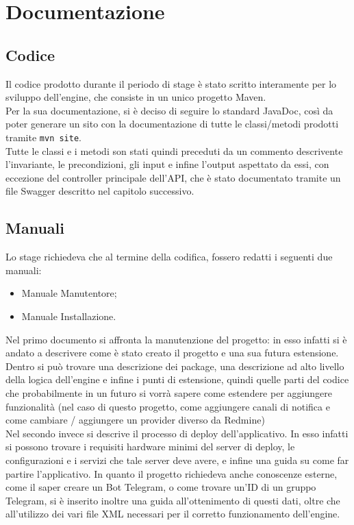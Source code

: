 
\chapter{Documentazione}
\label{cap:documentazione}
	\section{Codice}
		Il codice prodotto durante il periodo di stage è stato scritto interamente per lo sviluppo dell'engine, che consiste in un unico progetto Maven. \\
		Per la sua documentazione, si è deciso di seguire lo standard JavaDoc, così da poter generare un sito con la documentazione di tutte le classi/metodi prodotti tramite \texttt{mvn site}. \\
		Tutte le classi e i metodi son stati quindi preceduti da un commento descrivente l'invariante, le precondizioni, gli input e infine l'output aspettato da essi, con eccezione del controller principale dell'API, che è stato documentato tramite un file Swagger descritto nel capitolo successivo. 
	\section{Manuali}
		Lo stage richiedeva che al termine della codifica, fossero redatti i seguenti due manuali:
		\begin{itemize}
			\item Manuale Manutentore;
			\item Manuale Installazione.
		\end{itemize}
		Nel primo documento si affronta la manutenzione del progetto: in esso infatti si è andato a descrivere come è stato creato il progetto e una sua futura estensione. Dentro si può trovare una descrizione dei package, una descrizione ad alto livello della logica dell'engine e infine i punti di estensione, quindi quelle parti del codice che probabilmente in un futuro si vorrà sapere come estendere per aggiungere funzionalità (nel caso di questo progetto, come aggiungere canali di notifica e come cambiare / aggiungere un provider diverso da Redmine)\\
		Nel secondo invece si descrive il processo di deploy dell'applicativo. In esso infatti si possono trovare i requisiti hardware minimi del server di deploy, le configurazioni e i servizi che tale server deve avere, e infine una guida su come far partire l'applicativo. In quanto il progetto richiedeva anche conoscenze esterne, come il saper creare un Bot Telegram, o come trovare un'ID di un gruppo Telegram, si è inserito inoltre una guida all'ottenimento di questi dati, oltre che all'utilizzo dei vari file XML necessari per il corretto funzionamento dell'engine.
